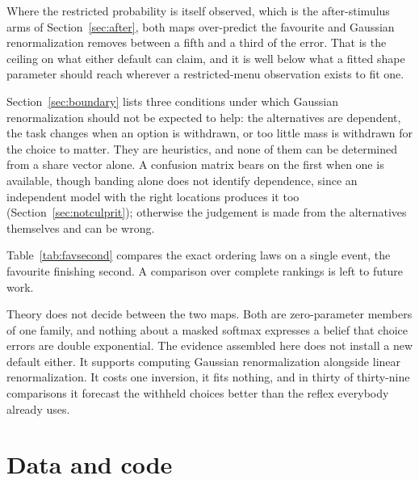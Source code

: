 \documentclass[11pt]{article}
\theoremstyle{italichead}
\begin{document}
Where the restricted probability is itself observed, which is the after-stimulus arms of
Section~\ref{sec:after}, both maps over-predict the favourite and Gaussian renormalization removes
between a fifth and a third of the error. That is the ceiling on what either default can claim,
and it is well below what a fitted shape parameter should reach wherever a restricted-menu
observation exists to fit one.

Section~\ref{sec:boundary} lists three conditions under which Gaussian renormalization should
not be expected to help: the alternatives are dependent, the task changes when an option is
withdrawn, or too little mass is withdrawn for the choice to matter. They are heuristics, and
none of them can be determined from a share vector alone. A confusion
matrix bears on the first when one is available, though banding alone does not identify
dependence, since an independent model with the right locations produces it too
(Section~\ref{sec:notculprit}); otherwise the judgement is made from the alternatives themselves
and can be wrong.

Table~\ref{tab:favsecond} compares the exact ordering laws on a single event, the favourite
finishing second. A comparison over complete rankings is left to future work.

Theory does not decide between the two maps. Both are zero-parameter members of one family, and
nothing about a masked softmax expresses a belief that choice errors are double exponential. The
evidence assembled here does not install a new default either. It supports computing Gaussian
renormalization alongside linear renormalization. It costs one inversion, it fits nothing, and in
thirty of thirty-nine comparisons it forecast the withheld choices better than the reflex
everybody already uses.

\section*{Data and code}
\end{document}
